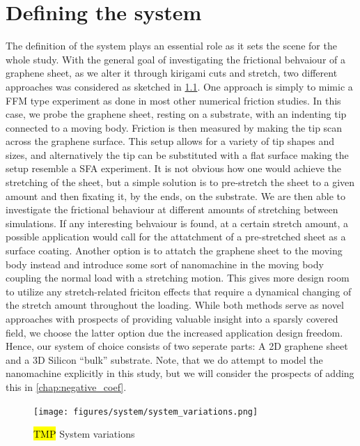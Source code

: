 \chapter{Defining the system}
The definition of the system plays an essential role as it sets the scene for
the whole study. With the general goal of investigating the frictional behvaiour
of a graphene sheet, as we alter it through kirigami cuts and stretch, two
different approaches was considered as sketched in \cref{fig:system_variations}.
One approach is simply to mimic a \acrshort{FFM} type experiment as done in most
other numerical friction studies. In this case, we probe the graphene sheet,
resting on a substrate, with an indenting tip connected to a moving body.
Friction is then measured by making the tip scan across the graphene surface.
This setup allows for a variety of tip shapes and sizes, and alternatively the
tip can be substituted with a flat surface making the setup resemble a
\acrshort{SFA} experiment. It is not obvious how one would achieve the
stretching of the sheet, but a simple solution is to pre-stretch the sheet to a
given amount and then fixating it, by the ends, on the substrate. We are then
able to investigate the frictional behaviour at different amounts of stretching
between simulations. If any interesting behvaiour is found, at a certain stretch
amount, a possible application would call for the attatchment of a pre-stretched
sheet as a surface coating. Another option is to attatch the graphene sheet to
the moving body instead and introduce some sort of nanomachine in the moving
body coupling the normal load with a stretching motion. This gives more
design room to utilize any stretch-related friciton effects that require a
dynamical changing of the stretch amount throughout the loading. While both
methods serve as novel approaches with prospects of providing valuable insight
into a sparsly covered field, we choose the latter option due the increased
application design freedom. Hence, our system of choice
consists of two seperate parts: A 2D graphene sheet and a 3D Silicon ``bulk''
substrate. Note, that we do attempt to model the nanomachine explicitly in this
study, but we will consider the prospects of adding this in
\cref{chap:negative_coef}. 


\begin{figure}[H]
  \centering
  \texttt{[image: figures/system/system\_variations.png]}
  \caption{\hl{TMP} System variations}
  \label{fig:system_variations}
\end{figure}


